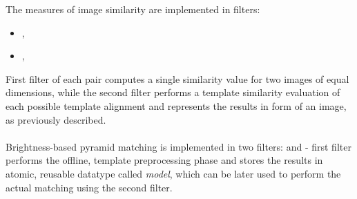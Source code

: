 \begin{refImpl}
The measures of image similarity are implemented in \studio filters:
\begin{itemize}
	\item {}, 
	\item {}, 
\end{itemize}
First filter of each pair computes a single similarity value for two images of equal dimensions, while the second filter performs a template similarity evaluation of each possible template alignment and represents the results in form of an image, as previously described.

\paragraph*{}
Brightness-based pyramid matching is implemented in two \studio filters:  and  - first filter performs the offline, template preprocessing phase and stores the results in atomic, reusable datatype called \textit{model}, which can be later used to perform the actual matching using the second filter.
\end{refImpl}